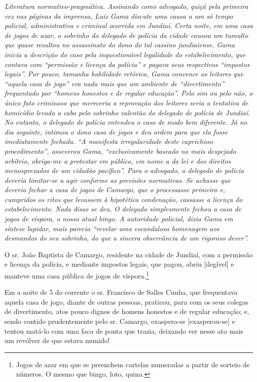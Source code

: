 {\begin{didascalia}
\emph{Literatura normativo-pragmática. Assinando como advogado, quiçá
pela primeira vez nas páginas da imprensa, Luiz Gama discute uma causa a
um só tempo policial, administrativa e criminal ocorrida em Jundiaí.
Certa noite, em uma casa de jogos de azar, o sobrinho do delegado de
polícia da cidade causou um tumulto que quase resultou no assassinato do
dono do tal cassino jundiaiense. Gama inicia a descrição do caso pela
inquestionável legalidade do estabelecimento, que contava com ``permissão
e licença da polícia'' e pagava seus respectivos ``impostos legais''. Por
pouco, tamanha habilidade retórica, Gama convence os leitores que
``aquela casa de jogo'' era nada mais que um ambiente de ``divertimento''
frequentado por ``homens honestos e de regular educação''. Pelo sim ou
pelo não, o único fato criminoso que mereceria a reprovação dos leitores
seria a tentativa de homicídio levada a cabo pelo sobrinho valentão do
delegado de polícia de Jundiaí. No entanto, o delegado de polícia
entendeu o caso de modo bem diferente. Já no dia seguinte, intimou o
dono casa de jogos e deu ordem para que ela fosse imediatamente fechada.
``A manifesta irregularidade deste caprichoso procedimento'', asseverou
Gama, ``exclusivamente baseado no mais despejado arbítrio, obriga-me a
protestar em público, em nome a da lei e dos direitos menosprezados de
um cidadão pacífico''. Para o advogado, o delegado de polícia deveria
limitar-se a agir conforme as previsões normativas. Se achasse que
deveria fechar a casa de jogos de Camargo, que o processasse primeiro e,
cumpridos os ritos que levassem à hipotética condenação, cassasse a
licença do estabelecimento. Nada disso se deu. O delegado simplesmente
fechou a casa de jogos de víspora, o nosso atual bingo. A autoridade
policial, dizia Gama em síntese lapidar, mais parecia ``revelar uma
escandalosa homenagem aos desmandos do seu sobrinho, do que a sincera
observância de um rigoroso dever''.}
\end{didascalia}

\asterisc{}

O sr. João Baptista de Camargo, residente na cidade de Jundiaí, com a
permissão e licença da polícia, e mediante impostos legais, que pagou,
abriu {[}ilegível{]} e manteve uma casa pública de jogos de
víspora.\footnote{ Jogos de azar em que se preenchem cartelas numeradas
  a partir de sorteio de números. O mesmo que bingo, loto, quina.}

Em a noite de 5 do corrente o sr. Francisco de Salles Cunha, que
frequentava aquela casa de jogo, diante de outras pessoas, praticou,
para com os seus colegas de divertimento, atos pouco dignos de homens
honestos e de regular educação; e, sendo contido prudentemente pelo sr.
Camargo, exaspera-se {[}exasperou-se{]} e tentou matá-lo com uma faca de
ponta que trazia, deixando ver nesse ato mais um revólver de que estava
munido!

}
